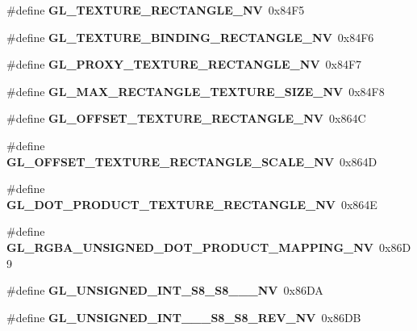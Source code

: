 \begin{DoxyCompactItemize}
\item 
\#define {\bfseries G\+L\+\_\+\+T\+E\+X\+T\+U\+R\+E\+\_\+\+R\+E\+C\+T\+A\+N\+G\+L\+E\+\_\+\+N\+V}~0x84\+F5\label{_s_d_l__opengl_8h_a8086185ae815ff734e7c294bf1c8c2a6}

\item 
\#define {\bfseries G\+L\+\_\+\+T\+E\+X\+T\+U\+R\+E\+\_\+\+B\+I\+N\+D\+I\+N\+G\+\_\+\+R\+E\+C\+T\+A\+N\+G\+L\+E\+\_\+\+N\+V}~0x84\+F6\label{_s_d_l__opengl_8h_aa201327aeca8a456ba4ad2200acd7160}

\item 
\#define {\bfseries G\+L\+\_\+\+P\+R\+O\+X\+Y\+\_\+\+T\+E\+X\+T\+U\+R\+E\+\_\+\+R\+E\+C\+T\+A\+N\+G\+L\+E\+\_\+\+N\+V}~0x84\+F7\label{_s_d_l__opengl_8h_a993441ff2787763694ca20b49df93fc2}

\item 
\#define {\bfseries G\+L\+\_\+\+M\+A\+X\+\_\+\+R\+E\+C\+T\+A\+N\+G\+L\+E\+\_\+\+T\+E\+X\+T\+U\+R\+E\+\_\+\+S\+I\+Z\+E\+\_\+\+N\+V}~0x84\+F8\label{_s_d_l__opengl_8h_a0957ed0aa08ed37189007bbf85efd492}

\item 
\#define {\bfseries G\+L\+\_\+\+O\+F\+F\+S\+E\+T\+\_\+\+T\+E\+X\+T\+U\+R\+E\+\_\+\+R\+E\+C\+T\+A\+N\+G\+L\+E\+\_\+\+N\+V}~0x864\+C\label{_s_d_l__opengl_8h_a0bbbe612cd4e7b2141514717203f09ff}

\item 
\#define {\bfseries G\+L\+\_\+\+O\+F\+F\+S\+E\+T\+\_\+\+T\+E\+X\+T\+U\+R\+E\+\_\+\+R\+E\+C\+T\+A\+N\+G\+L\+E\+\_\+\+S\+C\+A\+L\+E\+\_\+\+N\+V}~0x864\+D\label{_s_d_l__opengl_8h_ac24a9856b5b454a680e73b8fbb659695}

\item 
\#define {\bfseries G\+L\+\_\+\+D\+O\+T\+\_\+\+P\+R\+O\+D\+U\+C\+T\+\_\+\+T\+E\+X\+T\+U\+R\+E\+\_\+\+R\+E\+C\+T\+A\+N\+G\+L\+E\+\_\+\+N\+V}~0x864\+E\label{_s_d_l__opengl_8h_a7f4e9bad02b762f4c44a09f93192fc69}

\item 
\#define {\bfseries G\+L\+\_\+\+R\+G\+B\+A\+\_\+\+U\+N\+S\+I\+G\+N\+E\+D\+\_\+\+D\+O\+T\+\_\+\+P\+R\+O\+D\+U\+C\+T\+\_\+\+M\+A\+P\+P\+I\+N\+G\+\_\+\+N\+V}~0x86\+D9\label{_s_d_l__opengl_8h_a94f3d9da7c7f0c17fd77b9e09ed5f0f1}

\item 
\#define {\bfseries G\+L\+\_\+\+U\+N\+S\+I\+G\+N\+E\+D\+\_\+\+I\+N\+T\+\_\+\+S8\+\_\+\+S8\+\_\+\_\+\_\+\+N\+V}~0x86\+D\+A\label{_s_d_l__opengl_8h_ab85dc7d9ed9ea2fd61dab55aac99137f}

\item 
\#define {\bfseries G\+L\+\_\+\+U\+N\+S\+I\+G\+N\+E\+D\+\_\+\+I\+N\+T\+\_\+\_\+\_\+\+S8\+\_\+\+S8\+\_\+\+R\+E\+V\+\_\+\+N\+V}~0x86\+D\+B\label{_s_d_l__opengl_8h_a80d1b8049578225925adee6114e0ff1f}


\end{DoxyCompactItemize}

